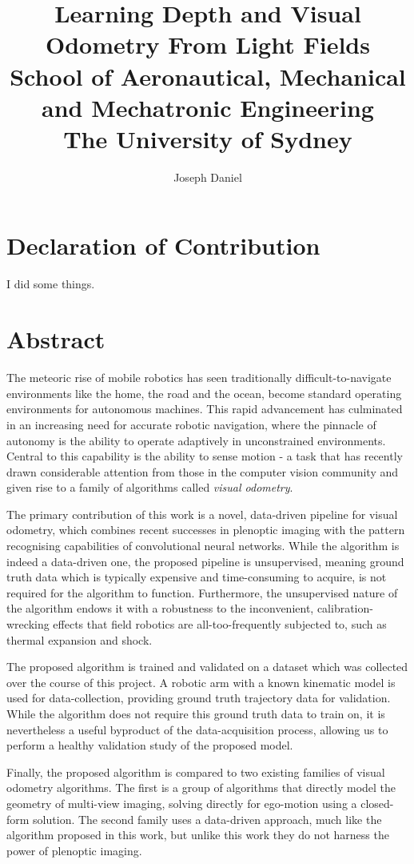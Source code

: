 \documentclass[openany]{book}
\title{Learning Depth and Visual Odometry From Light Fields \\
\large School of Aeronautical, Mechanical and Mechatronic Engineering \\
\large The University of Sydney}
\author{Joseph Daniel}
\begin{document}
\maketitle

\chapter*{Declaration of Contribution}
I did some things.

\chapter*{Abstract}

The meteoric rise of mobile robotics has seen traditionally difficult-to-navigate environments like the home, the road and the ocean, become standard operating environments for autonomous machines. This rapid advancement has culminated in an increasing need for accurate robotic navigation, where the pinnacle of autonomy is the ability to operate adaptively in unconstrained environments. Central to this capability is the ability to sense motion - a task that has recently drawn considerable attention from those in the computer vision community and given rise to a family of algorithms called \textit{visual odometry}. 

The primary contribution of this work is a novel, data-driven pipeline for visual odometry, which combines recent successes in plenoptic imaging with the pattern recognising capabilities of convolutional neural networks. While the algorithm is indeed a data-driven one, the proposed pipeline is unsupervised, meaning ground truth data which is typically expensive and time-consuming to acquire, is not required for the algorithm to function. Furthermore, the unsupervised nature of the algorithm endows it with a robustness to the inconvenient, calibration-wrecking effects that field robotics are all-too-frequently subjected to, such as thermal expansion and shock. 

The proposed algorithm is trained and validated on a dataset which was collected over the course of this project. A robotic arm with a known kinematic model is used for data-collection, providing ground truth trajectory data for validation. While the algorithm does not require this ground truth data to train on, it is nevertheless a useful byproduct of the data-acquisition process, allowing us to perform a healthy validation study of the proposed model.

Finally, the proposed algorithm is compared to two existing families of visual odometry algorithms. The first is a group of algorithms that directly model the geometry of multi-view imaging, solving directly for ego-motion using a closed-form solution. The second family uses a data-driven approach, much like the algorithm proposed in this work, but unlike this work they do not harness the power of plenoptic imaging.
\end{document}
